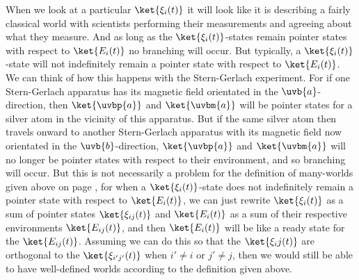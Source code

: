     When we look at a particular $\ket{\xi_i(t)}$ it will look like it is describing a fairly classical world with scientists performing their measurements and agreeing about what they measure. And as long as the $\ket{\xi_i(t)}$-states remain pointer states with respect to $\ket{E_i(t)}$ no branching will occur. But typically, a $\ket{\xi_i(t)}$-state will not indefinitely remain a pointer state with respect to $\ket{E_i(t)}$. We can think of how this happens with the Stern-Gerlach experiment. For if one Stern-Gerlach apparatus has its magnetic field orientated in the $\uvb{a}$-direction, then $\ket{\uvbp{a}}$ and $\ket{\uvbm{a}}$ will be pointer states for a silver atom in the vicinity of this apparatus. But if the same silver atom then travels onward to another Stern-Gerlach apparatus with its magnetic field now orientated in the $\uvb{b}$-direction, $\ket{\uvbp{a}}$ and $\ket{\uvbm{a}}$ will no longer be pointer states with respect to their environment, and so branching will occur. But this is not necessarily a problem for the definition of many-worlds given above on page \pageref{rigorousworld}, for when a $\ket{\xi_i(t)}$-state does not indefinitely remain a pointer state with respect to $\ket{E_i(t)}$, we can just rewrite $\ket{\xi_i(t)}$ as a sum of pointer states $\ket{\xi_{ij}(t)}$ and $\ket{E_i(t)}$  as a sum of their respective environments $\ket{E_{ij}(t)}$, and then $\ket{E_i(t)}$ will be like a ready state for the $\ket{E_{ij}(t)}$. Assuming we can do this so that the $\ket{\xi_ij(t)}$ are orthogonal to the $\ket{\xi_{i'j'}(t)}$ when $i'\neq i$ or $j'\neq j$, then we would still be able to have well-defined worlds according to the definition given above.
   